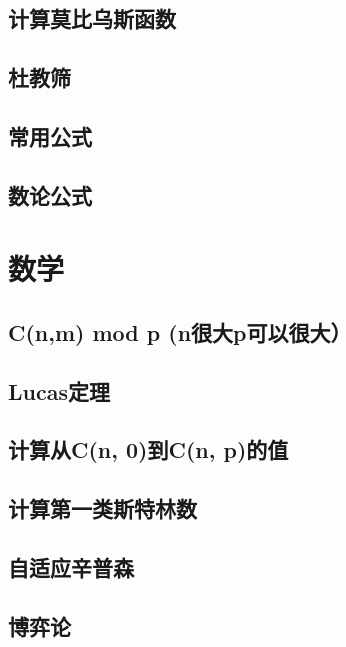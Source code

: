 \section{计算莫比乌斯函数}
\raggedbottom
\hrulefill
\section{杜教筛}
\raggedbottom
\hrulefill
\section{常用公式}
\raggedbottom
\hrulefill
\section{数论公式}
\raggedbottom
\hrulefill

\chapter{数学}
\section{C(n,m) mod p (n很大p可以很大）}
\raggedbottom
\hrulefill
\section{Lucas定理}
\raggedbottom
\hrulefill
\section{计算从C(n, 0)到C(n, p)的值}
\raggedbottom
\hrulefill
\section{计算第一类斯特林数}
\raggedbottom
\hrulefill
\section{自适应辛普森}
\raggedbottom
\hrulefill
\section{博弈论}
\raggedbottom
\hrulefill
